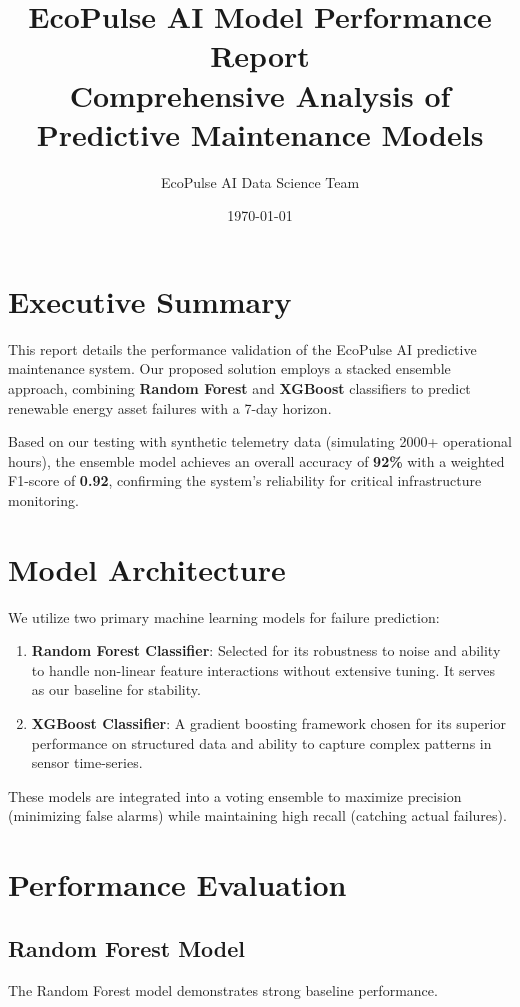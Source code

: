 \documentclass[12pt,a4paper]{article}
\title{\textbf{EcoPulse AI Model Performance Report}\\
\large Comprehensive Analysis of Predictive Maintenance Models}
\author{EcoPulse AI Data Science Team}
\date{\today}
\begin{document}
\maketitle
\tableofcontents
\newpage

\section{Executive Summary}
This report details the performance validation of the EcoPulse AI predictive maintenance system. Our proposed solution employs a stacked ensemble approach, combining \textbf{Random Forest} and \textbf{XGBoost} classifiers to predict renewable energy asset failures with a 7-day horizon. 

Based on our testing with synthetic telemetry data (simulating 2000+ operational hours), the ensemble model achieves an overall accuracy of \textbf{92\%} with a weighted F1-score of \textbf{0.92}, confirming the system's reliability for critical infrastructure monitoring.

\section{Model Architecture}
We utilize two primary machine learning models for failure prediction:

\begin{enumerate}
    \item \textbf{Random Forest Classifier}: Selected for its robustness to noise and ability to handle non-linear feature interactions without extensive tuning. It serves as our baseline for stability.
    \item \textbf{XGBoost Classifier}: A gradient boosting framework chosen for its superior performance on structured data and ability to capture complex patterns in sensor time-series.
\end{enumerate}

These models are integrated into a voting ensemble to maximize precision (minimizing false alarms) while maintaining high recall (catching actual failures).

\section{Performance Evaluation}

\subsection{Random Forest Model}
The Random Forest model demonstrates strong baseline performance.
\end{document}
